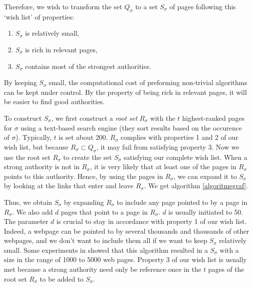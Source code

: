 \documentclass[a4paper,11pt]{report}
\begin{document}
Therefore, we wish to transform the set $Q_\sigma$ to a set $S_\sigma$ of pages following 
this `wish list' of properties:
\begin{enumerate}
  \item $S_\sigma$ is relatively small,
  \item $S_\sigma$ is rich in relevant pages,
  \item$S_\sigma$ contains most of the strongest authorities.
\end{enumerate}
By keeping $S_\sigma$ small, the computational cost of preforming 
non-trivial algorithms can be kept under control. By the property of being rich 
in relevant pages, it will be easier to find good authorities. 

To construct $S_\sigma$, we first construct a \emph{root set} $R_\sigma$ with the $t$ highest-ranked pages for $\sigma$ 
using a text-based search engine (they sort results based on the occurence of 
$\sigma$). Typically, $t$ is set about $200$. $R_\sigma$ complies with properties 1 and 2 
of our wish list, but because $R_\sigma \subset Q_\sigma$, it may fail from satisfying 
property 3. Now we use the root set $R_\sigma$ to create the set $S_\sigma$ satisfying our 
complete wish list. When a strong authority is not in $R_\sigma$, it is very 
likely that at least one of the pages in $R_\sigma$ points to this authority. 
Hence, by using the pages in $R_\sigma$, we can expand it to $S_\sigma$ by looking 
at the links that enter and leave $R_\sigma$. We get algorithm \ref{algoritmegraf}.

Thus, we obtain $S_\sigma$ by expanding
$R_\sigma$ to include any page pointed to by a page in $R_\sigma$. We also add $d$ pages that point
to a page in $R_\sigma$. $d$ is usually initiated to 50. The parameter $d$ is 
crucial to stay in accordance with property 1 of our wish list. Indeed, a 
webpage can be pointed to by several thousands and thousands of other webpages, 
and we don't want to include them all if we want to keep $S_\sigma$ relatively 
small. Some experiments in \cite{kleinberg} showed that this algorithm resulted in a $S_\sigma$ 
with a size in the range of 1000 to 5000 web pages. Property 3 of our wish list is usually met 
because a strong authority need only be reference once in the $t$ pages of the 
root set $R_\sigma$ to be added to $S_\sigma$. 
\end{document}
